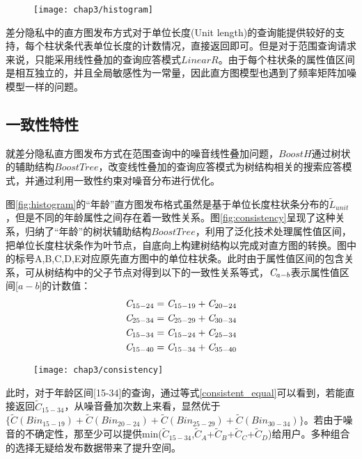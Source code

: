 \begin{figure}[!htp]
	\centering
	\texttt{[image: chap3/histogram]}
\end{figure}

差分隐私中的直方图发布方式对于单位长度(Unit length)的查询能提供较好的支持，每个柱状条代表单位长度的计数情况，直接返回即可。但是对于范围查询请求来说，只能采用线性叠加的查询应答模式$LinearR$。由于每个柱状条的属性值区间是相互独立的，并且全局敏感性为一常量，因此直方图模型也遇到了频率矩阵加噪模型一样的问题。

\subsection{一致性特性}
\label{LP_publish}

就差分隐私直方图发布方式在范围查询中的噪音线性叠加问题，$BoostH$通过树状的辅助结构$BoostTree$，改变线性叠加的查询应答模式为树结构相关的搜索应答模式，并通过利用一致性约束对噪音分布进行优化。

图\ref{fig:histogram}的“年龄”直方图发布格式虽然是基于单位长度柱状条分布的$\tilde{L}_{unit}$，但是不同的年龄属性之间存在着一致性关系。图\ref{fig:consistency}呈现了这种关系，归纳了“年龄”的树状辅助结构$BoostTree$，利用了泛化技术处理属性值区间，把单位长度柱状条作为叶节点，自底向上构建树结构以完成对直方图的转换。图中的标号A,B,C,D,E对应原先直方图中的单位柱状条。此时由于属性值区间的包含关系，可从树结构中的父子节点对得到以下的一致性关系等式，${\it{C}}_{a-b}$表示属性值区间[$a-b$]的计数值：
\begin{equation}
\label{consistent_equal}
\begin{split}
&{\it{C}}_{15-24} = {\it{C}}_{15-19}+{\it{C}}_{20-24}\\
&{\it{C}}_{25-34} = {\it{C}}_{25-29}+{\it{C}}_{30-34}\\
&{\it{C}}_{15-34} = {\it{C}}_{15-24}+{\it{C}}_{25-34}\\
&{\it{C}}_{15-40} = {\it{C}}_{15-34}+{\it{C}}_{35-40}
\end{split}
\end{equation}

\begin{figure}[!htp]
	\centering
	\texttt{[image: chap3/consistency]}
\end{figure}

此时，对于年龄区间[15-34]的查询，通过等式\ref{consistent_equal}可以看到，若能直接返回{$\widetilde{C}_{15-34}$}，从噪音叠加次数上来看，显然优于$\{\tilde{C}(Bin_{15-19})+\tilde{C}(Bin_{20-24})+\tilde{C}(Bin_{25-29})+\tilde{C}(Bin_{30-34})\}$。若由于噪音的不确定性，那至少可以提供min({$\tilde{C}_{15-34}$},{$\tilde{C}_{A}$}+{$\tilde{C}_{B}$}+{$\tilde{C}_{C}$}+{$\tilde{C}_{D}$})给用户。多种组合的选择无疑给发布数据带来了提升空间。

